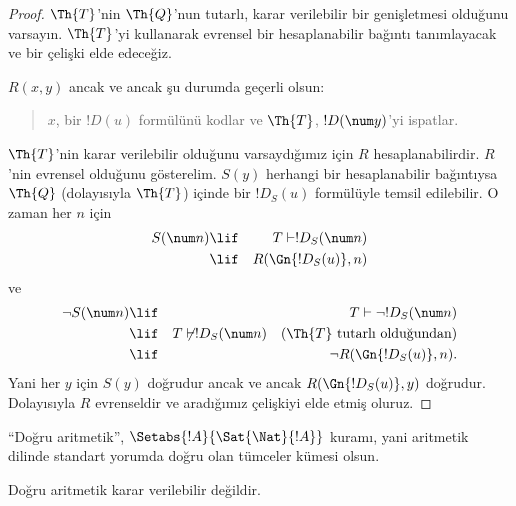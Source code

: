 \documentclass[../../../include/open-logic-section]{subfiles}
\begin{document}
\begin{proof}
$\Th{T}$'nin $\Th{Q}$'nun tutarlı, karar verilebilir bir genişletmesi
olduğunu varsayın. $\Th{T}$'yi kullanarak evrensel bir hesaplanabilir
bağıntı tanımlayacak ve bir çelişki elde edeceğiz.

$R(x,y)$ ancak ve ancak şu durumda geçerli olsun:
\begin{quote}
$x$, bir $!D(u)$ formülünü kodlar ve $\Th{T}$, $!D(\num y)$'yi ispatlar.
\end{quote}
$\Th{T}$'nin karar verilebilir olduğunu varsaydığımız için $R$
hesaplanabilirdir. $R$'nin evrensel olduğunu gösterelim. $S(y)$ herhangi bir
hesaplanabilir bağıntıysa $\Th{Q}$ (dolayısıyla $\Th{T}$) içinde bir
$!D_S(u)$ formülüyle temsil edilebilir. O zaman her $n$ için
\begin{eqnarray*}
S(\num n) & \lif & T \vdash !D_S(\num n) \\
& \lif & R(\Gn{!D_S(u)}, n)
\end{eqnarray*}
ve
\begin{eqnarray*}
\lnot S(\num n) & \lif & T \vdash \lnot !D_S(\num n) \\
& \lif & T \not\vdash !D_S(\num n) \quad \text{($\Th{T}$ tutarlı
  olduğundan)} \\
& \lif & \lnot R(\Gn{!D_S(u)}, n).
\end{eqnarray*}
Yani her $y$ için $S(y)$ doğrudur ancak ve ancak
$R(\Gn{!D_S(u)}, y)$ doğrudur. Dolayısıyla $R$ evrenseldir ve aradığımız
çelişkiyi elde etmiş oluruz.
\end{proof}

“Doğru aritmetik”, $\Setabs{!A}{ \Sat{\Nat}{!A}}$ kuramı, yani aritmetik
dilinde standart yorumda doğru olan tümceler kümesi olsun.

\begin{cor}
Doğru aritmetik karar verilebilir değildir.
\end{cor}

\end{document}
